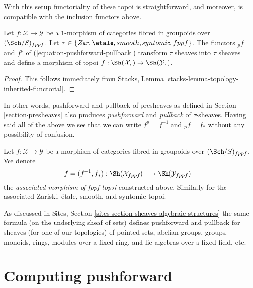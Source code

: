 \medskip\noindent
With this setup functoriality of these topoi is straightforward, and
moreover, is compatible with the inclusion functors above.

\begin{lemma}
\label{lemma-functoriality-sheaves}
Let $f : \mathcal{X} \to \mathcal{Y}$ be a $1$-morphism of categories
fibred in groupoids over $(\Sch/S)_{fppf}$. Let
$\tau \in \{Zar, \etale, smooth, syntomic, fppf\}$.
The functors ${}_pf$ and $f^p$ of (\ref{equation-pushforward-pullback})
transform $\tau$ sheaves into $\tau$ sheaves and define a morphism
of topoi
$f : \Sh(\mathcal{X}_\tau) \to \Sh(\mathcal{Y}_\tau)$.
\end{lemma}

\begin{proof}
This follows immediately from
Stacks, Lemma \ref{stacks-lemma-topology-inherited-functorial}.
\end{proof}

\noindent
In other words, pushforward and pullback of presheaves as defined in
Section \ref{section-presheaves}
also produces {\it pushforward} and {\it pullback} of $\tau$-sheaves.
Having said all of the above we see that we can write $f^p = f^{-1}$
and ${}_pf = f_*$ without any possibility of confusion.

\begin{definition}
\label{definition-morphism}
Let $f : \mathcal{X} \to \mathcal{Y}$ be a morphism of categories
fibred in groupoids over $(\Sch/S)_{fppf}$. We denote
$$
f = (f^{-1}, f_*) :
\Sh(\mathcal{X}_{fppf})
\longrightarrow
\Sh(\mathcal{Y}_{fppf})
$$
the {\it associated morphism of fppf topoi} constructed above.
Similarly for the associated Zariski, \'etale, smooth, and syntomic topoi.
\end{definition}

\noindent
As discussed in
Sites, Section \ref{sites-section-sheaves-algebraic-structures}
the same formula (on the underlying sheaf of sets) defines
pushforward and pullback for sheaves (for one of our topologies)
of pointed sets, abelian groups, groups, monoids, rings, modules
over a fixed ring, and lie algebras over a fixed field, etc.








\section{Computing pushforward}
\label{section-pushforward}


